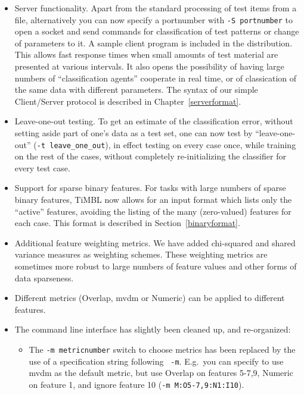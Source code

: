 \documentclass{report}
\begin{document}
\begin{itemize}

\item Server functionality. Apart from the standard processing of test
items from a file, alternatively you can now specify a portnumber with
{\tt -S portnumber} to open a socket and send commands for
classification of test patterns or change of parameters to it. A
sample client program is included in the distribution. This allows
fast response times when small amounts of test material are presented
at various intervals. It also opens the possibility of having large
numbers of ``classification agents'' cooperate in real time, or of
classication of the same data with different parameters. The syntax of
our simple Client/Server protocol is described in
Chapter~\ref{serverformat}.

\item Leave-one-out testing. To get an estimate of the classification
error, without setting aside part of one's data as a test set, one
can now test by ``leave-one-out'' ({\tt -t leave\_one\_out}), in effect
testing on every case once, while training on the rest of the cases,
without completely re-initializing the classifier for every test case.

\item Support for sparse binary features. For tasks with large numbers
of sparse binary features, TiMBL now allows for an input format which
lists only the ``active'' features, avoiding the listing of the many
(zero-valued) features for each case. This format is described in
Section~\ref{binaryformat}.

\item Additional feature weighting metrics. We have added chi-squared
and shared variance measures as weighting schemes. These weighting
metrics are sometimes more robust to large numbers of feature values
and other forms of data sparseness.

\item Different metrics (Overlap, {\sc mvdm} or Numeric) can be
applied to different features.

\item The command line interface has slightly been cleaned up, and
re-organized:

\begin{itemize}

\item The {\tt -m metricnumber} switch to choose metrics has been
replaced by the use of a specification string following {\tt
-m}. E.g.~you can specify to use {\sc mvdm} as the default metric, but
use Overlap on features 5-7,9, Numeric on feature 1, and ignore
feature 10 ({\tt -m M:O5-7,9:N1:I10}).


\end{itemize}
\end{itemize}
\end{document}
